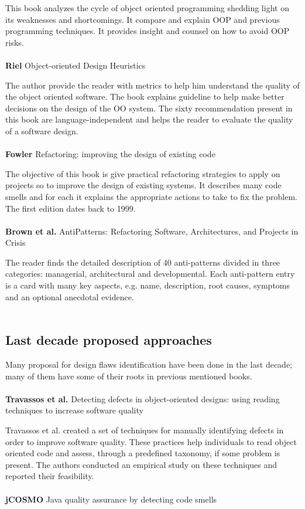 This book analyzes the cycle of object oriented programming shedding light on its weaknesses and shortcomings. It compare and explain OOP and previous programming techniques. It provides insight and counsel on how to avoid OOP risks.
\\
\\
\textbf{Riel} \cite{riel1996object} Object-oriented Design Heuristics

The author provide the reader with metrics to help him understand the quality of the object oriented software. The book explains guideline to help make better decisions on the design of the OO system. 
The sixty recommendation present in this book are language-independent and helps the reader to evaluate the quality of a software design.
\\
\\
\textbf{Fowler} \cite{fowler2018refactoring} Refactoring: improving the design of existing code

The objective of this book is give practical refactoring strategies to apply on projects so to improve the design of existing systems. It describes many code smells and for each it explains the appropriate actions to take to fix the problem. The first edition dates back to 1999.
\\
\\
\textbf{Brown et al.} \cite{brownantipatterns} AntiPatterns: Refactoring Software, Architectures, and Projects in Crisis

The reader finds the detailed description of 40 anti-patterns divided in three categories: managerial, architectural and developmental. 
Each anti-pattern entry is a card with many key aspects, e.g. name, description, root causes, symptoms and an optional anecdotal evidence.
\\
\\
\subsection{Last decade proposed approaches}
Many proposal for design flaws identification have been done in the last decade; many of them have some of their roots in previous mentioned books.
\\
\\
\textbf{Travassos et al.} \cite{travassos1999detecting} Detecting defects in object-oriented designs: using reading techniques to increase software quality

Travassos et al. created a set of techniques for manually identifying defects in order to improve software quality. These practices help individuals to read object oriented code and assess, through a predefined taxonomy, if some problem is present. The authors conducted an empirical study on these techniques and reported their feasibility.
\\
\\
\textbf{jCOSMO} \cite{van2002java} Java quality assurance by detecting code smells


